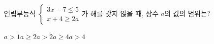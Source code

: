연립부등식 $\begin{cases} 3x-7\le 5 \\ x+4\ge 2a \end{cases}$가 해를 갖지 않을 때, 상수 $a$의 값의 범위는?
\begin{choices32}{$a>1$}{$a\ge 2$}{$a>2$}{$a\ge 4$}{$a>4$}\end{choices32}
